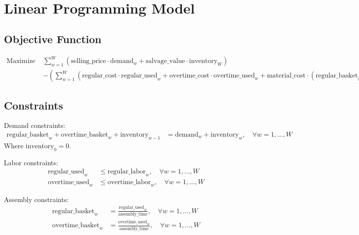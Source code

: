 \documentclass{article}
\begin{document}
\section*{Linear Programming Model}

\subsection*{Objective Function}
\begin{align*}
\text{Maximize } & \sum_{w=1}^{W} \left( \text{selling\_price} \cdot \text{demand}_{w} + \text{salvage\_value} \cdot \text{inventory}_W \right) \\
& - \left( \sum_{w=1}^{W} \left( \text{regular\_cost} \cdot \text{regular\_used}_w + \text{overtime\_cost} \cdot \text{overtime\_used}_w + \text{material\_cost} \cdot (\text{regular\_basket}_w + \text{overtime\_basket}_w) + \text{holding\_cost} \cdot \text{inventory}_w \right) \right)
\end{align*}

\subsection*{Constraints}
Demand constraints:
\begin{align*}
\text{regular\_basket}_w + \text{overtime\_basket}_w + \text{inventory}_{w-1} &= \text{demand}_{w} + \text{inventory}_w, \quad \forall w = 1, \ldots, W
\end{align*}
Where \(\text{inventory}_0 = 0\).

Labor constraints:
\begin{align*}
\text{regular\_used}_w &\leq \text{regular\_labor}_w, \quad \forall w = 1, \ldots, W \\
\text{overtime\_used}_w &\leq \text{overtime\_labor}_w, \quad \forall w = 1, \ldots, W
\end{align*}

Assembly constraints:
\begin{align*}
\text{regular\_basket}_w &= \frac{\text{regular\_used}_w}{\text{assembly\_time}}, \quad \forall w = 1, \ldots, W \\
\text{overtime\_basket}_w &= \frac{\text{overtime\_used}_w}{\text{assembly\_time}}, \quad \forall w = 1, \ldots, W
\end{align*}
\end{document}
